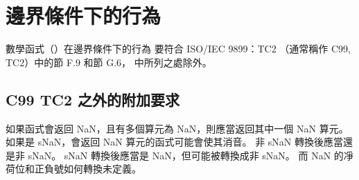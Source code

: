 \section[sec:edgeCaseBehavior]{邊界條件下的行為}

數學函式（）在邊界條件下的行為
要符合 ISO/IEC 9899：TC2 （通常稱作 C99, TC2）中的節 F.9 和節 G.6，
中所列之處除外。

\subsection[sec:addReqBeyondC99]{C99 TC2 之外的附加要求}

如果函式會返回 NaN，且有多個算元為 NaN，則應當返回其中一個 NaN 算元。
如果是 sNaN，會返回 NaN 算元的函式可能會使其消音。
非 sNaN 轉換後應當還是非 sNaN。
sNaN 轉換後應當是 NaN，但可能被轉換成非 sNaN。
而 NaN 的凈荷位和正負號如何轉換未定義。
